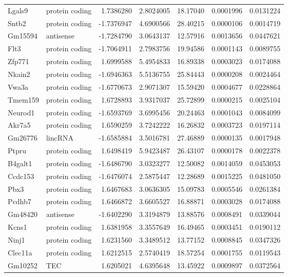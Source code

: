 \documentclass[onehalf,12pt]{beavtex}
\begin{document}
\begin{longtable}{llrrrrr}
  Lgals9 & protein coding & 1.7386280 & 2.8024005 & 18.17040 & 0.0001996 & 0.0131224\\
  Sntb2 & protein coding & -1.7376947 & 4.6900566 & 28.40215 & 0.0000106 & 0.0014719\\
  Gm15594 & antisense & -1.7284790 & 3.0643137 & 12.57916 & 0.0013656 & 0.0447621\\
  \addlinespace
  Flt3 & protein coding & -1.7064911 & 2.7983756 & 19.94586 & 0.0001143 & 0.0089755\\
  Zfp771 & protein coding & 1.6999588 & 5.4954833 & 16.89338 & 0.0003023 & 0.0174088\\
  Nkain2 & protein coding & -1.6946363 & 5.5136755 & 25.84443 & 0.0000208 & 0.0024464\\
  Vwa3a & protein coding & -1.6770673 & 2.9071307 & 15.59420 & 0.0004677 & 0.0228864\\
  Tmem159 & protein coding & 1.6728893 & 3.9317037 & 25.72899 & 0.0000215 & 0.0025104\\
  \addlinespace
  Neurod1 & protein coding & -1.6593769 & 3.6995456 & 20.24463 & 0.0001043 & 0.0084099\\
  Akr7a5 & protein coding & 1.6590259 & 3.7242222 & 16.26832 & 0.0003723 & 0.0197114\\
  Gm26776 & lincRNA & -1.6585884 & 3.5016781 & 27.46889 & 0.0000135 & 0.0017948\\
  Ptpru & protein coding & 1.6498419 & 5.9423487 & 26.43107 & 0.0000178 & 0.0022378\\
  B4galt1 & protein coding & -1.6486790 & 3.0323277 & 12.50082 & 0.0014059 & 0.0453053\\
  \addlinespace
  Ccdc153 & protein coding & -1.6476074 & 2.5875447 & 12.28689 & 0.0015225 & 0.0481050\\
  Pbx3 & protein coding & 1.6467683 & 3.0636305 & 15.09783 & 0.0005546 & 0.0261384\\
  Pcdhb7 & protein coding & 1.6466872 & 3.6605527 & 16.88871 & 0.0003028 & 0.0174088\\
  Gm48420 & antisense & -1.6402290 & 3.3194879 & 13.88576 & 0.0008491 & 0.0339044\\
  Kcns1 & protein coding & 1.6381958 & 3.3557649 & 16.49465 & 0.0003451 & 0.0190112\\
  \addlinespace
  Ninj1 & protein coding & 1.6231560 & 3.3489512 & 13.77152 & 0.0008845 & 0.0347326\\
  Clec11a & protein coding & 1.6212515 & 2.5740419 & 18.57254 & 0.0001755 & 0.0119543\\
  Gm10252 & TEC & 1.6205021 & 4.6395648 & 13.45922 & 0.0009897 & 0.0372564\\

\end{longtable}
\end{document}
